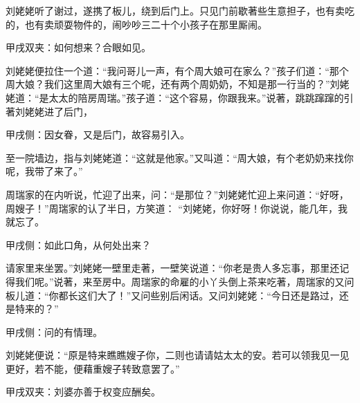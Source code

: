 \begin{parag}
    刘姥姥听了谢过，遂携了板儿，绕到后门上。只见门前歇著些生意担子，也有卖吃的，也有卖顽耍物件的，闹吵吵三二十个小孩子在那里厮闹。\begin{note}甲戌双夹：如何想来？合眼如见。\end{note}刘姥姥便拉住一个道：“我问哥儿一声，有个周大娘可在家么？”孩子们道：“那个周大娘？我们这里周大娘有三个呢，还有两个周奶奶，不知是那一行当的？”刘姥姥道：“是太太的陪房周瑞。”孩子道：“这个容易，你跟我来。”说著，跳跳蹿蹿的引著刘姥姥进了后门，\begin{note}甲戌侧：因女眷，又是后门，故容易引入。\end{note}至一院墙边，指与刘姥姥道：“这就是他家。”又叫道：“周大娘，有个老奶奶来找你呢，我带了来了。”
\end{parag}


\begin{parag}
    周瑞家的在内听说，忙迎了出来，问：“是那位？”刘姥姥忙迎上来问道：“好呀，周嫂子！”周瑞家的认了半日，方笑道： “刘姥姥，你好呀！你说说，能几年，我就忘了。\begin{note}甲戌侧：如此口角，从何处出来？\end{note}请家里来坐罢。”刘姥姥一壁里走著，一壁笑说道：“你老是贵人多忘事，那里还记得我们呢。”说著，来至房中。周瑞家的命雇的小丫头倒上茶来吃著，周瑞家的又问板儿道：“你都长这们大了！”又问些别后闲话。又问刘姥姥：“今日还是路过，还是特来的？”\begin{note}甲戌侧：问的有情理。\end{note}刘姥姥便说：“原是特来瞧瞧嫂子你，二则也请请姑太太的安。若可以领我见一见更好，若不能，便藉重嫂子转致意罢了。”\begin{note}甲戌双夹：刘婆亦善于权变应酬矣。\end{note}
\end{parag}


